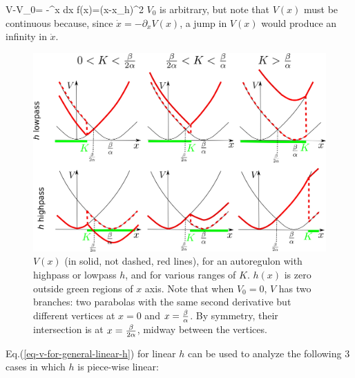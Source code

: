 \beq
V-V_0= -\int^x dx\; f(x)=(x-x_h)^2
\label{eq-v-for-general-linear-h}
\eeq
$V_0$ is arbitrary, but note that $V(x)$ must be continuous
because, since $\dot{x}=-\partial_xV(x)$, a jump in $V(x)$
would produce an infinity in $\dot{x}$.

\begin{figure}[h!]
\centering
\includegraphics[width=4.7in]
{autoregulons/v-low-high-pass.png}
\caption{ $V(x)$ (in solid, not dashed, red lines),
for an autoregulon with highpass or lowpass $h$,
and for various 
ranges of $K$.
$h(x)$ is zero outside green regions of $x$ axis.
Note that when $V_0=0$, $V$ has two branches: two
parabolas with the same second derivative but different vertices at $x=0$ and $x=\frac{\beta}{\alpha}$. 
By symmetry, their intersection is
at $x=\frac{\beta}{2\alpha}$,
midway between the vertices.}
\label{fig-v-low-high-pass}
\end{figure}

Eq.(\ref{eq-v-for-general-linear-h})
for linear $h$
can be used to analyze the following
3 cases
in which $h$
is piece-wise linear:

